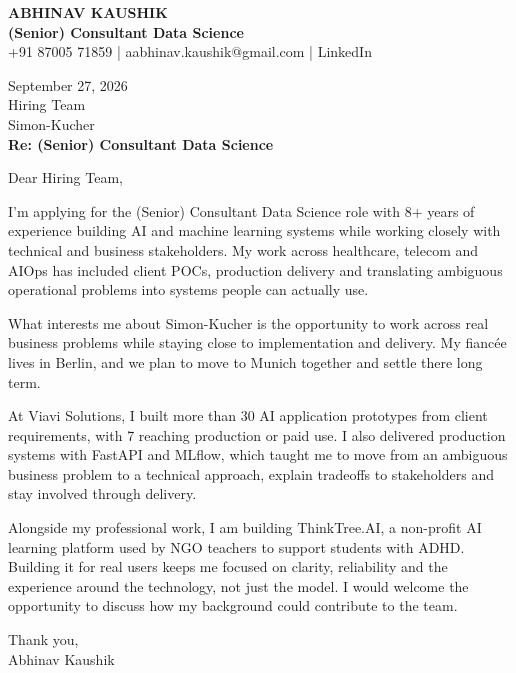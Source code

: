 \documentclass[10pt,a4paper]{article}
\begin{document}
\begin{center}
{\Large\bfseries ABHINAV KAUSHIK}\\[2pt]
{\bfseries (Senior) Consultant Data Science}\\[2pt]
+91 87005 71859 \quad | \quad aabhinav.kaushik@gmail.com \quad | \quad LinkedIn
\end{center}
\vspace{8pt}
September 27, 2026\\[6pt]
Hiring Team\\
Simon-Kucher\\[4pt]
\textbf{Re: (Senior) Consultant Data Science}

Dear Hiring Team,

I’m applying for the (Senior) Consultant Data Science role with 8+ years of experience building AI and machine learning systems while working closely with technical and business stakeholders. My work across healthcare, telecom and AIOps has included client POCs, production delivery and translating ambiguous operational problems into systems people can actually use.

What interests me about Simon-Kucher is the opportunity to work across real business problems while staying close to implementation and delivery. My fiancée lives in Berlin, and we plan to move to Munich together and settle there long term.

At Viavi Solutions, I built more than 30 AI application prototypes from client requirements, with 7 reaching production or paid use. I also delivered production systems with FastAPI and MLflow, which taught me to move from an ambiguous business problem to a technical approach, explain tradeoffs to stakeholders and stay involved through delivery.

Alongside my professional work, I am building ThinkTree.AI, a non-profit AI learning platform used by NGO teachers to support students with ADHD. Building it for real users keeps me focused on clarity, reliability and the experience around the technology, not just the model. I would welcome the opportunity to discuss how my background could contribute to the team.

Thank you,\\
Abhinav Kaushik
\end{document}
